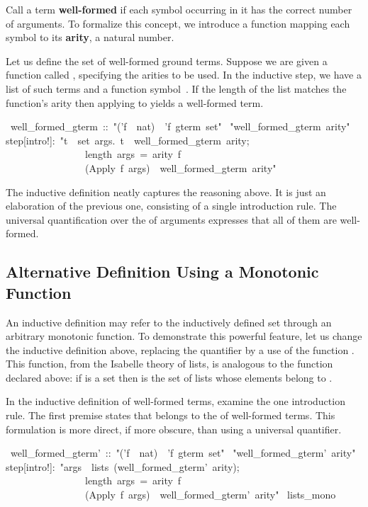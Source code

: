 Call a term \textbf{well-formed} if each symbol occurring in it has 
the correct number of arguments. To formalize this concept, we 
introduce a function mapping each symbol to its \textbf{arity}, a natural 
number. 

Let us define the set of well-formed ground terms. 
Suppose we are given a function called , specifying the arities to be used.
In the inductive step, we have a list  of such terms and a function 
symbol~. If the length of the list matches the function's arity 
then applying  to  yields a well-formed term. 
\begin{isabelle}
\ well_formed_gterm\ ::\ "('f\ \isasymRightarrow \ nat)\ \isasymRightarrow \ 'f\ gterm\ set"\isanewline
{}\ "well_formed_gterm\ arity"\isanewline
{}\isanewline
step[intro!]:\ "\isasymlbrakk \isasymforall t\ \isasymin \ set\ args.\ t\ \isasymin \ well_formed_gterm\ arity;\ \ \isanewline
\ \ \ \ \ \ \ \ \ \ \ \ \ \ \ \ length\ args\ =\ arity\ f\isasymrbrakk \isanewline
\ \ \ \ \ \ \ \ \ \ \ \ \ \ \ \isasymLongrightarrow \ (Apply\ f\ args)\ \isasymin \ well_formed_gterm\
arity"
\end{isabelle}
%
The inductive definition neatly captures the reasoning above.
It is just an elaboration of the previous one, consisting of a single 
introduction rule. The universal quantification over the
 of arguments expresses that all of them are well-formed.

\subsection{Alternative Definition Using a Monotonic Function}

An inductive definition may refer to the inductively defined 
set through an arbitrary monotonic function.  To demonstrate this
powerful feature, let us
change the  inductive definition above, replacing the
quantifier by a use of the function . This
function, from the Isabelle theory of lists, is analogous to the
function \isa{gterms} declared above: if  is a set then
{} is the set of lists whose elements belong to
\isa{A}.  

In the inductive definition of well-formed terms, examine the one
introduction rule.  The first premise states that \isa{args} belongs to
the \isa{lists} of well-formed terms.  This formulation is more
direct, if more obscure, than using a universal quantifier.
\begin{isabelle}
\ well_formed_gterm'\ ::\ "('f\ \isasymRightarrow \ nat)\ \isasymRightarrow \ 'f\ gterm\ set"\isanewline
\isacommand{inductive}\ "well_formed_gterm'\ arity"\isanewline
{}\isanewline
step[intro!]:\ "\isasymlbrakk args\ \isasymin \ lists\ (well_formed_gterm'\ arity);\ \ \isanewline
\ \ \ \ \ \ \ \ \ \ \ \ \ \ \ \ length\ args\ =\ arity\ f\isasymrbrakk \isanewline
\ \ \ \ \ \ \ \ \ \ \ \ \ \ \ \isasymLongrightarrow \ (Apply\ f\ args)\ \isasymin \ well_formed_gterm'\ arity"\isanewline
\isakeyword{monos}\ lists_mono
\end{isabelle}

